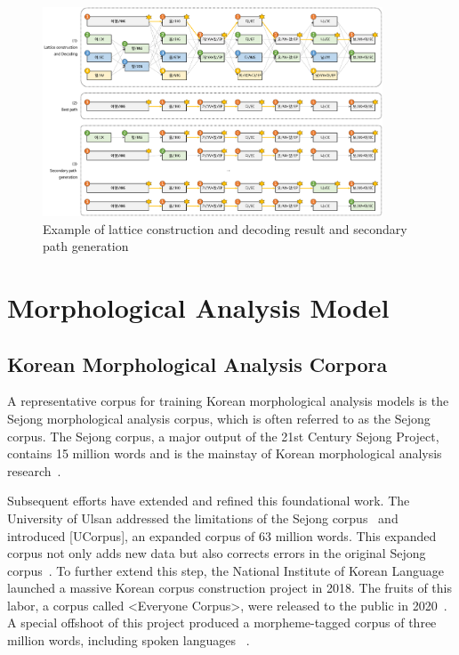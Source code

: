 \documentclass[AMS,STIX2COL]{WileyNJD-v2}
\begin{document}
    \begin{figure}[t]
        \centerline{\includegraphics[width=0.9\textwidth]{fig2.1}}
        \caption{Example of lattice construction and decoding result and secondary path generation}\label{fig:lattice}
    \end{figure}


    \section{Morphological Analysis Model}\label{sec:morphological-analysis-model}

    \subsection{Korean Morphological Analysis Corpora}\label{subsec3.1}

    A representative corpus for training Korean morphological analysis models is the Sejong morphological analysis corpus, which is often referred to as the Sejong corpus.
    The Sejong corpus, a major output of the 21st Century Sejong Project, contains 15 million words and is the mainstay of Korean morphological analysis research~\cite{ChoeMW2008}.

    Subsequent efforts have extended and refined this foundational work.
    The University of Ulsan addressed the limitations of the Sejong corpus~\cite{KimIH2010} and introduced [UCorpus], an expanded corpus of 63 million words.
    This expanded corpus not only adds new data but also corrects errors in the original Sejong corpus~\cite{UCorpusHG}.
    To further extend this step, the National Institute of Korean Language launched a massive Korean corpus construction project in 2018.
    The fruits of this labor, a corpus called <Everyone Corpus>, were released to the public in 2020~\cite{EveryoneCorpus}.
    A special offshoot of this project produced a morpheme-tagged corpus of three million words, including spoken languages ~\cite{KimIH2019}.
\end{document}

